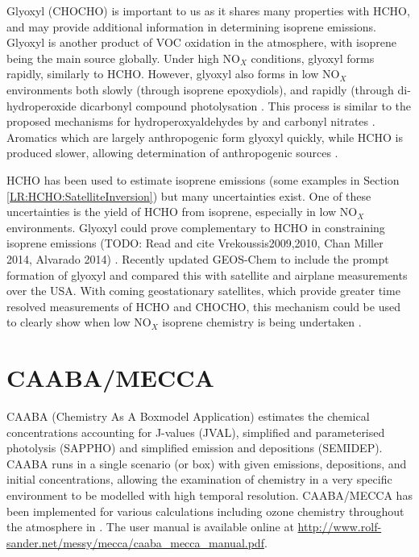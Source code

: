     Glyoxyl (CHOCHO) is important to us as it shares many properties with HCHO, and may provide additional information in determining isoprene emissions.
    Glyoxyl is another product of VOC oxidation in the atmosphere, with isoprene being the main source globally.
    Under high NO$_X$ conditions, glyoxyl forms rapidly, similarly to HCHO.
    However, glyoxyl also forms in low NO$_X$ environments both slowly (through isoprene epoxydiols), and rapidly (through di-hydroperoxide dicarbonyl compound photolysation \citep{Crounse2013}.
    This process is similar to the proposed mechanisms for hydroperoxyaldehydes by \cite{Peeters2014} and carbonyl nitrates \citep{Muller2014}.
    Aromatics which are largely anthropogenic form glyoxyl quickly, while HCHO is produced slower, allowing determination of anthropogenic sources \citep{Cao2018_discuss}.
    
    HCHO has been used to estimate isoprene emissions (some examples in Section \ref{LR:HCHO:SatelliteInversion}) but many uncertainties exist.
    One of these uncertainties is the yield of HCHO from isoprene, especially in low NO$_X$ environments.
    Glyoxyl could prove complementary to HCHO in constraining isoprene emissions (TODO: Read and cite Vrekoussis2009,2010, Chan Miller 2014, Alvarado 2014) \citep{Miller2017}.
    Recently \cite{Miller2017} updated GEOS-Chem to include the prompt formation of glyoxyl and compared this with satellite and airplane measurements over the USA.
    With coming geostationary satellites, which provide greater time resolved measurements of HCHO and CHOCHO, this mechanism could be used to clearly show when low NO$_X$ isoprene chemistry is being undertaken \citep{Miller2017}.
    
  
\section{CAABA/MECCA}
  \label{Model:CM}
  
  
  CAABA (Chemistry As A Boxmodel Application) estimates the chemical concentrations accounting for J-values (JVAL), simplified and parameterised photolysis (SAPPHO) and simplified emission and depositions (SEMIDEP).
  CAABA runs in a single scenario (or box) with given emissions, depositions, and initial concentrations, allowing the examination of chemistry in a very specific environment to be modelled with high temporal resolution.
  CAABA/MECCA has been implemented for various calculations including ozone chemistry throughout the atmosphere in \cite{Zanis2014}.
  The user manual is available online at \url{http://www.rolf-sander.net/messy/mecca/caaba_mecca_manual.pdf}.
  
